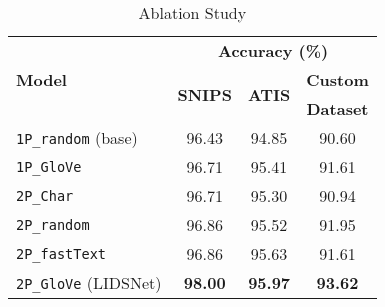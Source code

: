 \documentclass[conference]{IEEEtran}
\newcommand\Tstrut{\rule{0pt}{2.6ex}}
\newcommand\Bstrut{\rule[-0.9ex]{0pt}{0pt}}
\begin{document}
\begin{table}[t]
	\caption{Ablation Study}
	\centering
	\begin{tabular}{l c c c}
		\toprule
		\multirow{3}{*}{\textbf{Model}} &                               \multicolumn{3}{c}{\textbf{Accuracy (\%)}}                                \\ \cline{2-4}
		                                & \multirow{2}{*}{\textbf{SNIPS}} & \multirow{2}{*}{\textbf{ATIS}} & \textbf{Custom}  \Tstrut             \\
		                                &                                 &                                & \textbf{Dataset}                     \\ \midrule
		\verb|1P_random| (base)         & 96.43                           & 94.85                          & 90.60                  \Tstrut       \\
		\verb|1P_GloVe|                 & 96.71                           & 95.41                          & 91.61                  \Tstrut       \\
		\verb|2P_Char|                  & 96.71                           & 95.30                          & 90.94                  \Tstrut       \\
		\verb|2P_random|                & 96.86                           & 95.52                          & 91.95                  \Tstrut       \\
		\verb|2P_fastText|              & 96.86                           & 95.63                          & 91.61                  \Tstrut       \\
		\verb|2P_GloVe| (LIDSNet)       & \textbf{98.00}                  & \textbf{95.97}                 & \textbf{93.62}	       \Tstrut\Bstrut \\ \bottomrule
	\end{tabular}
	\label{tab:ablationStudy}
\end{table}
\end{document}
